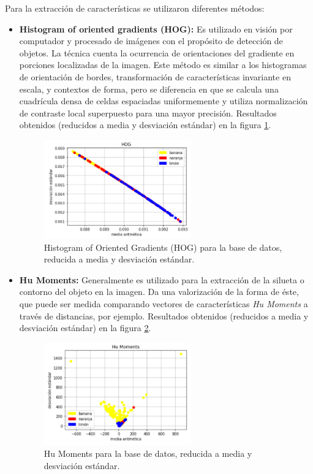 \documentclass[10pt,a4paper]{article}
\begin{document}
Para la extracción de características se utilizaron diferentes métodos:
\begin{itemize}
\item \textbf{Histogram of oriented gradients (HOG):} Es utilizado en visión por computador y procesado de imágenes con el propósito de detección de objetos. La técnica cuenta la ocurrencia de orientaciones del gradiente en porciones localizadas de la imagen. Este método es similar a los histogramas de orientación de bordes, transformación de características invariante en escala, y contextos de forma, pero se diferencia en que se calcula una cuadrícula densa de celdas espaciadas uniformemente y utiliza normalización de contraste local superpuesto para una mayor precisión. Resultados obtenidos (reducidos a media y desviación estándar) en la figura \ref{hog}.

\begin{figure}[h]
\centering
\includegraphics[width=0.6\textwidth]{imgs/resultado-04_hog.png}
\caption{Histogram of Oriented Gradients (HOG) para la base de datos, reducida a media y desviación estándar.}
\label{hog}
\end{figure}

\item \textbf{Hu Moments:} Generalmente es utilizado para la extracción de la silueta o contorno del objeto en la imagen. Da una valorización de la forma de éste, que puede ser medida comparando vectores de características \textit{Hu Moments} a través de distancias, por ejemplo. Resultados obtenidos (reducidos a media y desviación estándar) en la figura \ref{hu_moments}.

\begin{figure}[h]
\centering
\includegraphics[width=0.6\textwidth]{imgs/resultado-04_hm.png}
\caption{Hu Moments para la base de datos, reducida a media y desviación estándar.}
\label{hu_moments}
\end{figure}


\end{itemize}
\end{document}
